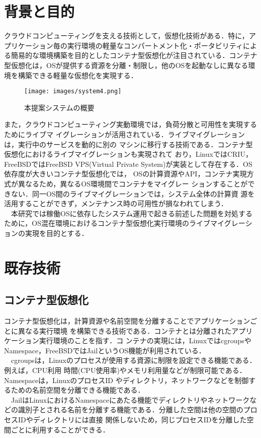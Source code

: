 \documentclass[11pt]{jarticle}
\begin{document}
\maketitle
\section{背景と目的}
クラウドコンピューティングを支える技術として，仮想化技術がある．特に，アプリケーション毎の実行環境の軽量なコンパートメント化・ポータビリティによる簡易的な環境構築を目的としたコンテナ型仮想化が注目されている\cite{focus-container}．コンテナ型仮想化は，OSが提供する資源を分離・制限し，他のOSを起動なしに異なる環境を構築できる軽量な仮想化を実現する．

\begin{figure*}[t]
  \centering
  \texttt{[image: images/system4.png]} \\
  \caption{本提案システムの概要}
  \label{fig:system}
\end{figure*}

また，クラウドコンピューティング実動環境では，負荷分散と可用性を実現するためにライブマ
イグレーションが活用されている．ライブマイグレーションは，実行中のサービスを動的に別の
マシンに移行する技術である．コンテナ型仮想化におけるライブマイグレーションも実現されて
おり，LinuxではCRIU\cite{container_live,criu}，FreeBSDではFreeBSD VPS(Virtual Private
 System)\cite{freebsd-vps}が実装として存在する．OS依存度が大きいコンテナ型仮想化では，
 OSの計算資源やAPI，コンテナ実現方式が異なるため，異なるOS環境間でコンテナをマイグレー
 ションすることができない．同一OS間のライブマイグレーションでは，システム全体の計算資
 源を活用することができず，メンテナンス時の可用性が損なわれてしまう．\\
　本研究では稼働OSに依存したシステム運用で起きる前述した問題を対処するために，OS混在環境におけるコンテナ型仮想化実行環境のライブマイグレーションの実現を目的とする．

\section{既存技術}
\subsection{コンテナ型仮想化}
\label{sec:container}

コンテナ型仮想化は，計算資源や名前空間を分離することでアプリケーションごとに異なる実行環境
を構築できる技術である．コンテナとは分離されたアプリケーション実行環境のことを指す．コ
ンテナの実現には，LinuxではcgroupsやNamespace，FreeBSDではJailというOS機能が利用されている．\\
　cgroupsは，Linuxのプロセスが使用する資源に制限を設定できる機能である．例えば，CPU利用
時間(CPU使用率)やメモリ利用量などが制限可能である．Namespaceは，LinuxのプロセスID
やディレクトリ，ネットワークなどを制御するための名前空間を分離できる機能である．\\
　JailはLinuxにおけるNamespaceにあたる機能でディレクトリやネットワークなどの識別子とされる名前を分離する機能である．分離した空間は他の空間のプロセスIDやディレクトリには直接
関係しないため，同じプロセスIDを分離した空間ごとに利用することができる．
\end{document}
